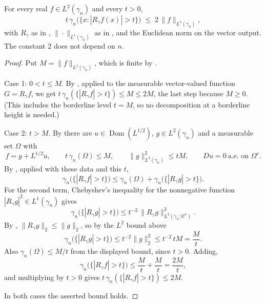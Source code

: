 \begin{lemma}
For every real $f \in L^2(\gamma_n)$ and every $t > 0$,
\[
  t\,\gamma_n\bigl(\{x : |R_\gamma f(x)| > t\}\bigr)
    \;\leq\; 2\,\|f\|_{L^1(\gamma_n)} ,
\]
with $R_\gamma$ as in , $\|\cdot\|_{L^1(\gamma_n)}$ as in
, and the Euclidean norm on the vector output.  The constant $2$
does not depend on $n$.
\end{lemma}
\begin{proof}
Put $M = \|f\|_{L^1(\gamma_n)}$, which is finite by .

Case 1: $0 < t \leq M$.  By , applied to the measurable
vector-valued function $G = R_\gamma f$, we get
$t\,\gamma_n(\{|R_\gamma f| > t\}) \leq M \leq 2M$, the last step because
$M \geq 0$.  (This includes the borderline level $t = M$, so no decomposition at a
borderline height is needed.)

Case 2: $t > M$.  By  there are
$u \in \operatorname{Dom}(L^{1/2})$, $g \in L^2(\gamma_n)$ and a measurable set
$\Omega$ with
\[
  f = g + L^{1/2}u, \qquad
  t\,\gamma_n(\Omega) \leq M, \qquad
  \|g\|_{L^2(\gamma_n)}^2 \leq tM, \qquad
  Du = 0 \ \text{a.e. on } \Omega^c .
\]
By , applied with these data and this $t$,
\[
  \gamma_n\bigl(\{|R_\gamma f|>t\}\bigr)
    \leq \gamma_n(\Omega) + \gamma_n\bigl(\{|R_\gamma g|>t\}\bigr) .
\]
For the second term, Chebyshev's inequality for the nonnegative function
$|R_\gamma g|^2 \in L^1(\gamma_n)$ gives
\[
  \gamma_n\bigl(\{|R_\gamma g|>t\}\bigr)
    \leq t^{-2}\,\|R_\gamma g\|_{L^2(\gamma_n;\mathbb{R}^n)}^2 .
\]
By , $\|R_\gamma g\|_2 \leq \|g\|_2$, so by the
$L^2$ bound above
\[
  \gamma_n\bigl(\{|R_\gamma g|>t\}\bigr)
    \leq t^{-2}\|g\|_2^2 \leq t^{-2}\,tM = \frac{M}{t} .
\]
Also $\gamma_n(\Omega) \leq M/t$ from the displayed bound, since $t > 0$.
Adding,
\[
  \gamma_n\bigl(\{|R_\gamma f|>t\}\bigr) \leq \frac{M}{t} + \frac{M}{t}
    = \frac{2M}{t},
\]
and multiplying by $t > 0$ gives
$t\,\gamma_n(\{|R_\gamma f|>t\}) \leq 2M$.

In both cases the asserted bound holds.
\end{proof}
